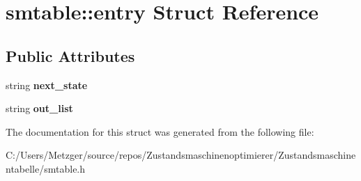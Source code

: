 \hypertarget{structsmtable_1_1entry}{}\section{smtable\+:\+:entry Struct Reference}
\label{structsmtable_1_1entry}
\subsection*{Public Attributes}
\begin{DoxyCompactItemize}
\item 
\mbox{\label{structsmtable_1_1entry_a969a0ef26bd2db818d8302830fa859c4}} 
string {\bfseries next\+\_\+state}
\item 
\mbox{\label{structsmtable_1_1entry_a749f2f04a0dd75e855891558395ed226}} 
string {\bfseries out\+\_\+list}
\end{DoxyCompactItemize}


The documentation for this struct was generated from the following file\+:\begin{DoxyCompactItemize}
\item 
C\+:/\+Users/\+Metzger/source/repos/\+Zustandsmaschinenoptimierer/\+Zustandsmaschinentabelle/smtable.\+h\end{DoxyCompactItemize}
